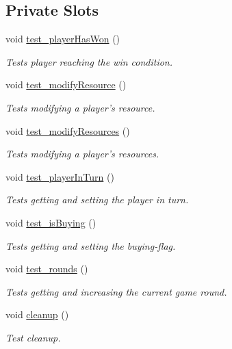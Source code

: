 \subsection*{Private Slots}
\begin{DoxyCompactItemize}
\item 
void \hyperlink{classdefault__gameeventhandler_af32f4c295555f30b7d922d1c55399e91}{test\-\_\-player\-Has\-Won} ()
\begin{DoxyCompactList}\small\item\em Tests player reaching the win condition. \end{DoxyCompactList}\item 
void \hyperlink{classdefault__gameeventhandler_a3eb2c5de5b08c3217a04d6b45d3b255b}{test\-\_\-modify\-Resource} ()
\begin{DoxyCompactList}\small\item\em Tests modifying a player's resource. \end{DoxyCompactList}\item 
void \hyperlink{classdefault__gameeventhandler_a17c006978a06fc12a6b88b3c1814e11c}{test\-\_\-modify\-Resources} ()
\begin{DoxyCompactList}\small\item\em Tests modifying a player's resources. \end{DoxyCompactList}\item 
void \hyperlink{classdefault__gameeventhandler_aa0b383fd6c699b1f044022bfe5269d2b}{test\-\_\-player\-In\-Turn} ()
\begin{DoxyCompactList}\small\item\em Tests getting and setting the player in turn. \end{DoxyCompactList}\item 
void \hyperlink{classdefault__gameeventhandler_a253bd1627b80b1259b2a1c30701e428c}{test\-\_\-is\-Buying} ()
\begin{DoxyCompactList}\small\item\em Tests getting and setting the buying-\/flag. \end{DoxyCompactList}\item 
void \hyperlink{classdefault__gameeventhandler_aaccee5017653e8216f2193c926e81265}{test\-\_\-rounds} ()
\begin{DoxyCompactList}\small\item\em Tests getting and increasing the current game round. \end{DoxyCompactList}\item 
void \hyperlink{classdefault__gameeventhandler_ab933cc221885e1793129cbe57e149c32}{cleanup} ()
\begin{DoxyCompactList}\small\item\em Test cleanup. \end{DoxyCompactList}\end{DoxyCompactItemize}
